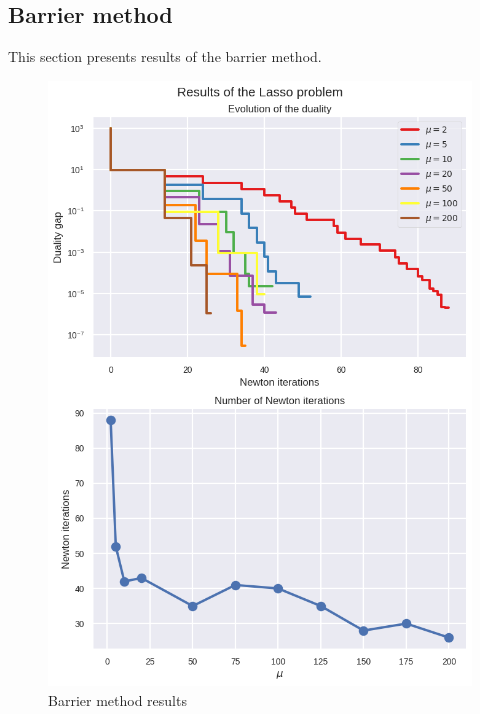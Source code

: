 \documentclass[11pt]{article}
\begin{document}
    \hypertarget{barrier-method}{%
\subsection{Barrier method}\label{barrier-method}}

This section presents results of the barrier method.

\begin{figure}
\centering
\includegraphics{outputs/lasso_pb_outputs.png}
\caption{Barrier method results}
\end{figure}


    
    
    
\end{document}
